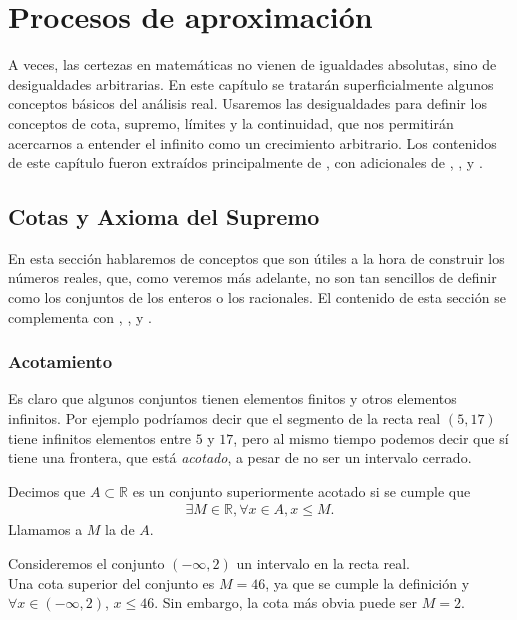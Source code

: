 \documentclass[12pt]{book}
\begin{document}
\chapter{Procesos de aproximación}\label{cap:3}
\noindent
A veces, las certezas en matemáticas no vienen de igualdades absolutas, sino de desigualdades arbitrarias. En este capítulo se tratarán superficialmente algunos conceptos básicos del análisis real. Usaremos las desigualdades para definir los conceptos de cota, supremo, límites y la continuidad, que nos permitirán acercarnos a entender el infinito como un crecimiento arbitrario. Los contenidos de este capítulo fueron extraídos principalmente de \cite{Notasuchile}, con adicionales de \cite{abbott2015understanding}, \cite{tao2006analysis}, y \cite{spivak2006calculus}.

\section{Cotas y Axioma del Supremo}
\noindent
En esta sección hablaremos de conceptos que son útiles a la hora de construir los números reales, que, como veremos más adelante, no son tan sencillos de definir como los conjuntos de los enteros o los racionales. El contenido de esta sección se complementa con \cite[Chapter 1, Section 1.3]{abbott2015understanding}, \cite[Chapter 5]{tao2006analysis}, y \cite[Chapter 8]{spivak2006calculus}.

\subsection{Acotamiento}
\noindent
Es claro que algunos conjuntos tienen elementos finitos y otros elementos infinitos. Por ejemplo podríamos decir que el segmento de la recta real $(5, 17)$ tiene infinitos elementos entre $5$ y $17$, pero al mismo tiempo podemos decir que sí tiene una frontera, que está \textit{acotado}, a pesar de no ser un intervalo cerrado.

\begin{definitionenv}
    Decimos que $A\subset\mathbb{R}$ es un conjunto superiormente acotado si se cumple que
    \begin{align*}
        \exists M\in \mathbb{R},\forall x \in A, x\leq M.
    \end{align*}
    Llamamos a $M$ la  de $A$.
\end{definitionenv}

\begin{exampleenv}
    Consideremos el conjunto $(-\infty,2)$ un intervalo en la recta real.\\
    Una cota superior del conjunto es $M=46$, ya que se cumple la definición y $\forall x\in (-\infty,2)$, $x\leq 46$. Sin embargo, la cota más obvia puede ser $M=2$.
\end{exampleenv}
\end{document}
